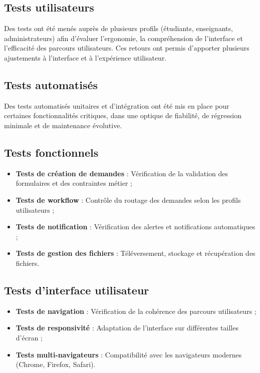 \subsection{Tests utilisateurs}

Des tests ont été menés auprès de plusieurs profils (étudiants, enseignants, administrateurs) afin d’évaluer l’ergonomie, la compréhension de l’interface et l'efficacité des parcours utilisateurs. Ces retours ont permis d'apporter plusieurs ajustements à l’interface et à l’expérience utilisateur.

\subsection{Tests automatisés}

Des tests automatisés unitaires et d’intégration ont été mis en place pour certaines fonctionnalités critiques, dans une optique de fiabilité, de régression minimale et de maintenance évolutive.

\subsection{Tests fonctionnels}

\begin{itemize}
  \item \textbf{Tests de création de demandes} : Vérification de la validation des formulaires et des contraintes métier ;
  \item \textbf{Tests de workflow} : Contrôle du routage des demandes selon les profils utilisateurs ;
  \item \textbf{Tests de notification} : Vérification des alertes et notifications automatiques ;
  \item \textbf{Tests de gestion des fichiers} : Téléversement, stockage et récupération des fichiers.
\end{itemize}

\subsection{Tests d’interface utilisateur}

\begin{itemize}
  \item \textbf{Tests de navigation} : Vérification de la cohérence des parcours utilisateurs ;
  \item \textbf{Tests de responsivité} : Adaptation de l’interface sur différentes tailles d’écran ;
  
  \item \textbf{Tests multi-navigateurs} : Compatibilité avec les navigateurs modernes (Chrome, Firefox, Safari).
\end{itemize}

